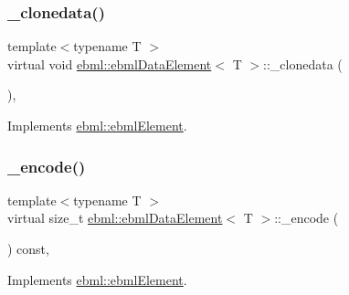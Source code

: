 \subsubsection{\texorpdfstring{\+\_\+clonedata()}{\_clonedata()}}
{\footnotesize\ttfamily template$<$typename T $>$ \\
virtual void \mbox{\hyperlink{classebml_1_1ebmlDataElement}{ebml\+::ebml\+Data\+Element}}$<$ T $>$\+::\+\_\+clonedata (\begin{DoxyParamCaption}\item[{const \mbox{\hyperlink{classebml_1_1ebmlElement}{ebml\+Element}} $\ast$}]{ }\end{DoxyParamCaption})\hspace{0.3cm}{\ttfamily [protected]}, {\ttfamily [virtual]}}



Implements \mbox{\hyperlink{classebml_1_1ebmlElement_a3ebe3aa75b62971f385c01f27c807a02}{ebml\+::ebml\+Element}}.

\mbox{\label{classebml_1_1ebmlDataElement_aabb10c15457709e0aa2c1f5744ddbfff}} 
\subsubsection{\texorpdfstring{\+\_\+encode()}{\_encode()}}
{\footnotesize\ttfamily template$<$typename T $>$ \\
virtual size\+\_\+t \mbox{\hyperlink{classebml_1_1ebmlDataElement}{ebml\+::ebml\+Data\+Element}}$<$ T $>$\+::\+\_\+encode (\begin{DoxyParamCaption}\item[{char $\ast$}]{ }\end{DoxyParamCaption}) const\hspace{0.3cm}{\ttfamily [protected]}, {\ttfamily [virtual]}}



Implements \mbox{\hyperlink{classebml_1_1ebmlElement_a27bd9de14e1706840235b68331917776}{ebml\+::ebml\+Element}}.

\mbox{\label{classebml_1_1ebmlDataElement_add3cc3627008b8139a054a3a0696bc2d}} 
